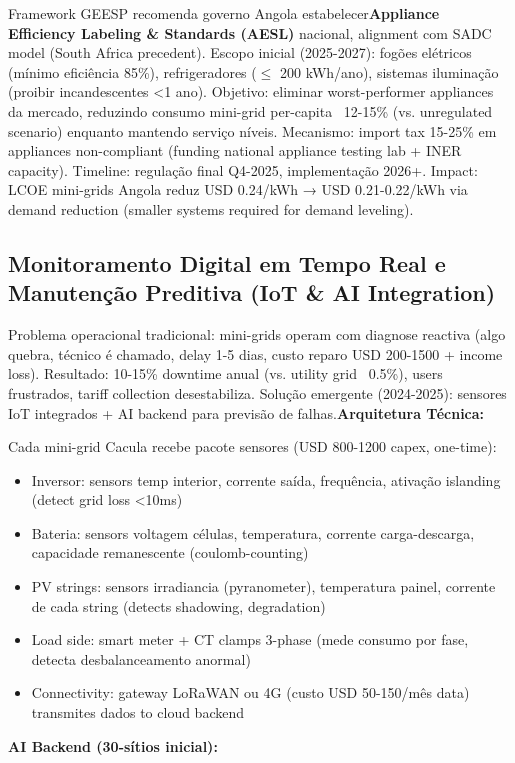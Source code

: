 \documentclass[12pt, a4paper]{article}
\begin{document}
Framework GEESP recomenda governo Angola estabelecer\textbf{Appliance Efficiency Labeling \& Standards (AESL)} nacional, alignment com SADC model (South Africa precedent). Escopo inicial (2025-2027): fogões elétricos (mínimo eficiência 85\%), refrigeradores ($\leq$ 200 kWh/ano), sistemas iluminação (proibir incandescentes <1 ano). Objetivo: eliminar worst-performer appliances da mercado, reduzindo consumo mini-grid per-capita ~12-15\% (vs. unregulated scenario) enquanto mantendo serviço níveis. Mecanismo: import tax 15-25\% em appliances non-compliant (funding national appliance testing lab + INER capacity). Timeline: regulação final Q4-2025, implementação 2026+. Impact: LCOE mini-grids Angola reduz USD 0.24/kWh → USD 0.21-0.22/kWh via demand reduction (smaller systems required for demand leveling).

\subsection{Monitoramento Digital em Tempo Real e Manutenção Preditiva (IoT \& AI Integration)}

Problema operacional tradicional: mini-grids operam com diagnose reactiva (algo quebra, técnico é chamado, delay 1-5 dias, custo reparo USD 200-1500 + income loss). Resultado: 10-15\% downtime anual (vs. utility grid ~0.5\%), users frustrados, tariff collection desestabiliza. Solução emergente (2024-2025): sensores IoT integrados + AI backend para previsão de falhas.\textbf{Arquitetura Técnica:}

Cada mini-grid Cacula recebe pacote sensores (USD 800-1200 capex, one-time):
\begin{itemize}
\item Inversor: sensors temp interior, corrente saída, frequência, ativação islanding (detect grid loss <10ms)
\item Bateria: sensors voltagem células, temperatura, corrente carga-descarga, capacidade remanescente (coulomb-counting)
\item PV strings: sensors irradiancia (pyranometer), temperatura painel, corrente de cada string (detects shadowing, degradation)
\item Load side: smart meter + CT clamps 3-phase (mede consumo por fase, detecta desbalanceamento anormal)
\item Connectivity: gateway LoRaWAN ou 4G (custo USD 50-150/mês data) transmites dados to cloud backend
\end{itemize}\textbf{AI Backend (30-sítios inicial):}
\end{document}
